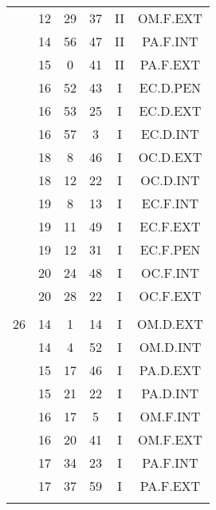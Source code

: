 \documentclass[12pt, a4paper]{article}
\begin{document}
\begin{multicols}{3}
{\begin{tabular}{c c c c c c}
	 	 	 	 & 12 & 29 & 37 & II & OM.F.EXT\\%
	 	 	 	 & 14 & 56 & 47 & II & PA.F.INT\\%
	 	 	 	 & 15 & 0 & 41 & II & PA.F.EXT\\%
	 	 	 	 & 16 & 52 & 43 & I & EC.D.PEN\\%
	 	 	 	 & 16 & 53 & 25 & I & EC.D.EXT\\%
	 	 	 	 & 16 & 57 & 3 & I & EC.D.INT\\%
	 	 	 	 & 18 & 8 & 46 & I & OC.D.EXT\\%
	 	 	 	 & 18 & 12 & 22 & I & OC.D.INT\\%
	 	 	 	 & 19 & 8 & 13 & I & EC.F.INT\\%
	 	 	 	 & 19 & 11 & 49 & I & EC.F.EXT\\%
	 	 	 	 & 19 & 12 & 31 & I & EC.F.PEN\\%
	 	 	 	 & 20 & 24 & 48 & I & OC.F.INT\\%
	 	 	 	 & 20 & 28 & 22 & I & OC.F.EXT\\%
	 	 	 	 & & & & & \\%
	 	 	 	26 & 14 & 1 & 14 & I & OM.D.EXT\\%
	 	 	 	 & 14 & 4 & 52 & I & OM.D.INT\\%
	 	 	 	 & 15 & 17 & 46 & I & PA.D.EXT\\%
	 	 	 	 & 15 & 21 & 22 & I & PA.D.INT\\%
	 	 	 	 & 16 & 17 & 5 & I & OM.F.INT\\%
	 	 	 	 & 16 & 20 & 41 & I & OM.F.EXT\\%
	 	 	 	 & 17 & 34 & 23 & I & PA.F.INT\\%
	 	 	 	 & 17 & 37 & 59 & I & PA.F.EXT\\%
	 	 	 	 & & & & & \\%

\end{tabular}}
\end{multicols}
\end{document}
